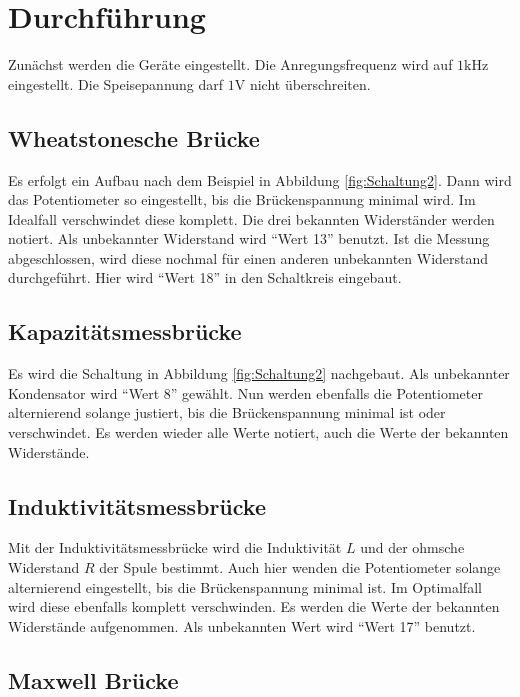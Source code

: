 \section{Durchführung}
\label{sec:Durchführung}

Zunächst werden die Geräte eingestellt.
Die Anregungsfrequenz wird auf $1 \si{\kilo\hertz}$ eingestellt.
Die Speisepannung darf $1 \si{\volt}$ nicht überschreiten.

\subsection{Wheatstonesche Brücke} \label{sec:wheatdurchf}
Es erfolgt ein Aufbau nach dem Beispiel in Abbildung \ref{fig:Schaltung2}.
Dann wird das Potentiometer so eingestellt, bis die Brückenspannung minimal wird.
Im Idealfall verschwindet diese komplett.
Die drei bekannten Widerständer werden notiert.
Als unbekannter Widerstand wird \enquote{Wert 13} benutzt.
Ist die Messung abgeschlossen, wird diese nochmal für einen anderen unbekannten Widerstand durchgeführt.
Hier wird \enquote{Wert 18} in den Schaltkreis eingebaut.

\subsection{Kapazitätsmessbrücke} \label{sec:kapazdurchf}

Es wird die Schaltung in Abbildung \ref{fig:Schaltung2} nachgebaut.
Als unbekannter Kondensator wird \enquote{Wert 8} gewählt.
Nun werden ebenfalls die Potentiometer alternierend solange justiert, bis die Brückenspannung minimal ist oder verschwindet.
Es werden wieder alle Werte notiert, auch die Werte der bekannten Widerstände.

\subsection{Induktivitätsmessbrücke} \label{sec:induktdurchf}

Mit der Induktivitätsmessbrücke wird die Induktivität $L$ und der ohmsche Widerstand $R$ der Spule bestimmt.
Auch hier wenden die Potentiometer solange alternierend eingestellt, bis die Brückenspannung minimal ist.
Im Optimalfall wird diese ebenfalls komplett verschwinden.
Es werden die Werte der bekannten Widerstände aufgenommen.
Als unbekannten Wert wird \enquote{Wert 17} benutzt.

\subsection{Maxwell Brücke} 

